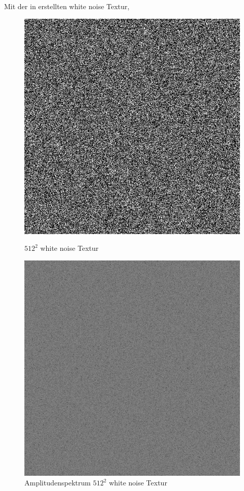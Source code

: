 Mit der in \cite{WhiteNoiseGenerator} erstellten white noise Textur,
\begin{figure}[H]\label{pic:whitenoiseFFT}
    \centering
    \begin{minipage}[t]{0.45\linewidth}
        \centering
        \includegraphics[width=\linewidth]{content/BlueNoise/Bilder/whitenoise.png}
        \caption{$512^{2}$ white noise Textur}
    \end{minipage}
    \hfill
    \begin{minipage}[t]{0.45\linewidth}
        \centering
        \includegraphics[width=\linewidth]{content/BlueNoise/Bilder/FFT_whitenoise.png}
        \caption{Amplitudenspektrum $512^{2}$ white noise Textur}
    \end{minipage}
\end{figure}

